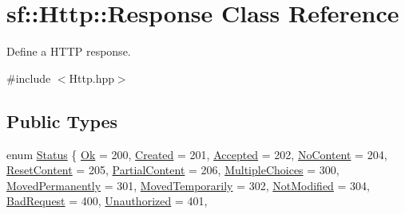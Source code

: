 \hypertarget{classsf_1_1_http_1_1_response}{}\section{sf\+:\+:Http\+:\+:Response Class Reference}
\label{classsf_1_1_http_1_1_response}


Define a H\+T\+TP response.  




{\ttfamily \#include $<$Http.\+hpp$>$}

\subsection*{Public Types}
\begin{DoxyCompactItemize}
\item 
enum \hyperlink{classsf_1_1_http_1_1_response_a663e071978e30fbbeb20ed045be874d8}{Status} \{ \newline
\hyperlink{classsf_1_1_http_1_1_response_a663e071978e30fbbeb20ed045be874d8a0158f932254d3f09647dd1f64bd43832}{Ok} = 200, 
\hyperlink{classsf_1_1_http_1_1_response_a663e071978e30fbbeb20ed045be874d8a0a6e8bafa9365a0ed10b8a9cbfd0649b}{Created} = 201, 
\hyperlink{classsf_1_1_http_1_1_response_a663e071978e30fbbeb20ed045be874d8ad328945457bd2f0d65107ba6b5ccd443}{Accepted} = 202, 
\hyperlink{classsf_1_1_http_1_1_response_a663e071978e30fbbeb20ed045be874d8aefde9e4abf5682dcd314d63143be42e0}{No\+Content} = 204, 
\newline
\hyperlink{classsf_1_1_http_1_1_response_a663e071978e30fbbeb20ed045be874d8a77327cc2a5e34cc64030b322e61d12a8}{Reset\+Content} = 205, 
\hyperlink{classsf_1_1_http_1_1_response_a663e071978e30fbbeb20ed045be874d8a0cfae3ab0469b73dfddc54312a5e6a8a}{Partial\+Content} = 206, 
\hyperlink{classsf_1_1_http_1_1_response_a663e071978e30fbbeb20ed045be874d8add95cbd8fa27516821f763488557f96b}{Multiple\+Choices} = 300, 
\hyperlink{classsf_1_1_http_1_1_response_a663e071978e30fbbeb20ed045be874d8a2f91651db3a09628faf68cbcefa0810a}{Moved\+Permanently} = 301, 
\newline
\hyperlink{classsf_1_1_http_1_1_response_a663e071978e30fbbeb20ed045be874d8a05c50d7b17c844e0b909e5802d5f1587}{Moved\+Temporarily} = 302, 
\hyperlink{classsf_1_1_http_1_1_response_a663e071978e30fbbeb20ed045be874d8a060ebc3af266e6bfe045b89e298e2545}{Not\+Modified} = 304, 
\hyperlink{classsf_1_1_http_1_1_response_a663e071978e30fbbeb20ed045be874d8a3f88a714cf5483ee22f9051e5a3c080a}{Bad\+Request} = 400, 
\hyperlink{classsf_1_1_http_1_1_response_a663e071978e30fbbeb20ed045be874d8ab7a79b7bff50fb1902c19eecbb4e2a2d}{Unauthorized} = 401, 

\end{DoxyCompactItemize}

